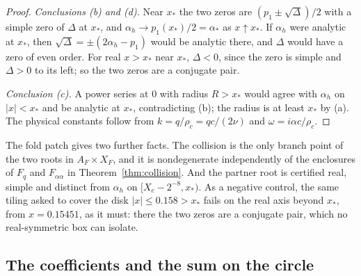 \begin{proof}
\emph{Conclusions (b) and (d).} Near $x_*$ the two zeros are $(p_1\pm\sqrt\Delta)/2$ with a simple zero of $\Delta$ at $x_*$, and $\alpha_h\to p_1(x_*)/2=\alpha_*$ as $x\uparrow x_*$. If $\alpha_h$ were analytic at $x_*$, then $\sqrt\Delta=\pm(2\alpha_h-p_1)$ would be analytic there, and $\Delta$ would have a zero of even order. For real $x>x_*$ near $x_*$, $\Delta<0$, since the zero is simple and $\Delta>0$ to its left; so the two zeros are a conjugate pair.

\emph{Conclusion (c).} A power series at $0$ with radius $R>x_*$ would agree with $\alpha_h$ on $|x|<x_*$ and be analytic at $x_*$, contradicting (b); the radius is at least $x_*$ by (a). The physical constants follow from $k=q/\rho_c=qc/(2\nu)$ and $\omega=i\alpha c/\rho_c$.
\end{proof}

The fold patch gives two further facts. The collision is the only branch point of the two roots in $A_F\times X_F$, and it is nondegenerate independently of the enclosures of $F_q$ and $F_{\alpha\alpha}$ in Theorem~\ref{thm:collision}. And the partner root is certified real, simple and distinct from $\alpha_h$ on $[X_c-2^{-8},x_*)$. As a negative control, the same tiling asked to cover the disk $|x|\le0.158>x_*$ fails on the real axis beyond $x_*$, from $x=0.15451$, as it must: there the two zeros are a conjugate pair, which no real-symmetric box can isolate.

\subsection{The coefficients and the sum on the circle}

